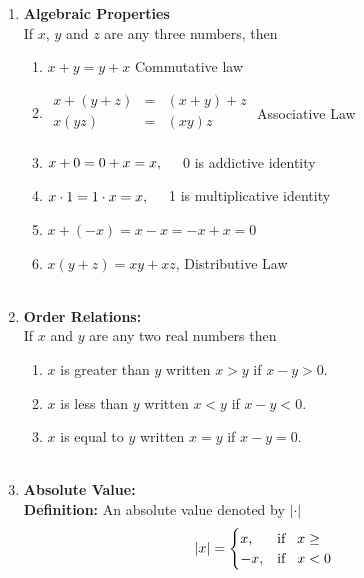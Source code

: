 \documentclass[11pt,a4paper]{article}
\begin{document}
\begin{enumerate}
\item \textbf{Algebraic Properties}\\
If $x$, $y$ and $z$ are any three numbers, then
\begin{enumerate}
\item $x+y=y+x$ \hspace{0.4cm} Commutative law

\item $
\begin{matrix}
x+(y+z) & = & (x+y)+z\\
x(yz) & = & (xy)z\\
\end{matrix}
$\hspace{0.4cm} Associative Law\\

\item $x+0=0+x=x,\hspace{0.4cm}$ 0 is addictive identity

\item $x\cdot 1=1\cdot x=x,\hspace{0.4cm}$ 1 is multiplicative identity

\item $x+(-x)=x-x=-x+x=0$

\item $x(y+z)=xy+xz$,\hspace{0.4cm} Distributive Law\\\\
\end{enumerate}

\item \textbf{Order Relations:}\\
If $x$ and $y$ are any two real numbers then
\begin{enumerate}
\item $x$ is greater than $y$ written $x>y$ if $x-y>0.$

\item $x$ is less than $y$ written $x<y$ if $x-y<0$.

\item $x$ is equal to $y$ written $x=y$ if $x-y=0$.\\\\
\end{enumerate}


\item \textbf{Absolute Value:}\\
\textbf{Definition:} An absolute value denoted by $|\cdot|$
$$|x|=
\begin{cases}
x, & \text{if}\hspace{0.3cm} x\geq\\
-x, & \text{if} \hspace{0.3cm} x<0\\
\end{cases}
$$


\end{enumerate}
\end{document}
